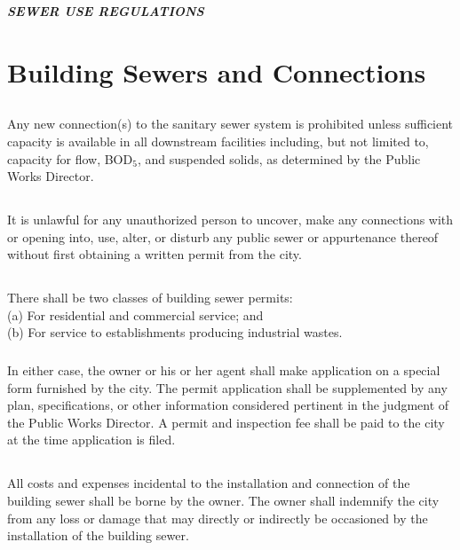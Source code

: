 \begin{center}
\emph{\textbf{\LARGE{SEWER USE REGULATIONS}}}
\end{center}

\setcounter{section}{14}
\section{Building Sewers and Connections}
\subsection{}
Any new connection(s) to the sanitary sewer system is prohibited unless sufficient capacity is available in all downstream facilities including, but not limited to, capacity for flow, BOD$_{5}$, and suspended solids, as determined by the Public Works Director.
\subsection{}
It is unlawful for any unauthorized person to uncover, make any connections with or opening into, use, alter, or disturb any public sewer or appurtenance thereof without first obtaining a written permit from the city.
\subsection{}
\subsubsection{}
There shall be two classes of building sewer permits:
\\\indent (a) For residential and commercial service; and
\\\indent (b) For service to establishments producing industrial wastes.
\subsubsection{}
In either case, the owner or his or her agent shall make application on a special form furnished by the city.  The permit application shall be supplemented by any plan, specifications, or other information considered pertinent in the judgment of the Public Works Director.  A permit and inspection fee shall be paid to the city at the time application is filed.
\subsection{}
All costs and expenses incidental to the installation and connection of the building sewer shall be borne by the owner.  The owner shall indemnify the city from any loss or damage that may directly or indirectly be occasioned by the installation of the building sewer.
